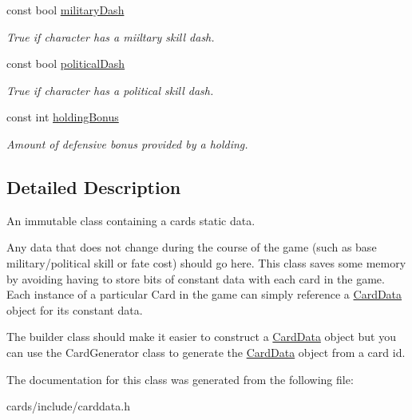 \begin{DoxyCompactItemize}
const bool \hyperlink{classl5r_1_1CardData_a0c30e25824e693585a7b38569412eaa6}{military\+Dash}
\begin{DoxyCompactList}\small\item\em True if character has a miiltary skill dash. \end{DoxyCompactList}\item 
\mbox{\label{classl5r_1_1CardData_a1d72ff395b8bde655e94f30219d465a5}} 
const bool \hyperlink{classl5r_1_1CardData_a1d72ff395b8bde655e94f30219d465a5}{political\+Dash}
\begin{DoxyCompactList}\small\item\em True if character has a political skill dash. \end{DoxyCompactList}\item 
\mbox{\label{classl5r_1_1CardData_a4dfdeaeddd5b067959f2f1c971e0cfad}} 
const int \hyperlink{classl5r_1_1CardData_a4dfdeaeddd5b067959f2f1c971e0cfad}{holding\+Bonus}
\begin{DoxyCompactList}\small\item\em Amount of defensive bonus provided by a holding. \end{DoxyCompactList}\end{DoxyCompactItemize}


\subsection{Detailed Description}
An immutable class containing a card\textquotesingle{}s static data. 

Any data that does not change during the course of the game (such as base military/political skill or fate cost) should go here. This class saves some memory by avoiding having to store bits of constant data with each card in the game. Each instance of a particular Card in the game can simply reference a \hyperlink{classl5r_1_1CardData}{Card\+Data} object for it\textquotesingle{}s constant data.

The builder class should make it easier to construct a \hyperlink{classl5r_1_1CardData}{Card\+Data} object but you can use the Card\+Generator class to generate the \hyperlink{classl5r_1_1CardData}{Card\+Data} object from a card id. 

The documentation for this class was generated from the following file\+:\begin{DoxyCompactItemize}
\item 
cards/include/carddata.\+h\end{DoxyCompactItemize}
